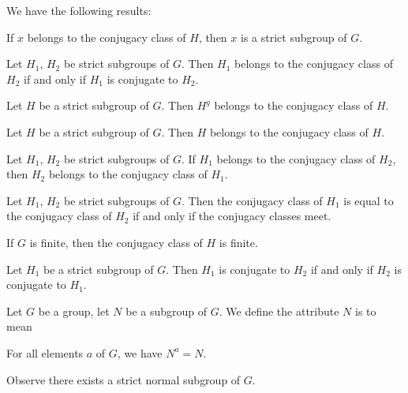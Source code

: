 \documentclass{article}
\begin{document}
We have the following results:
\begin{thm}
\item\label{group3:106} If $x$ belongs to the conjugacy class of $H$,
  then $x$ is a strict subgroup of $G$.
\item\label{group3:107} Let $H_{1}$, $H_{2}$ be strict subgroups of $G$.
  Then $H_{1}$ belongs to the conjugacy class of $H_{2}$ if and only if
  $H_{1}$ is conjugate to $H_{2}$.
\item\label{group3:108} Let $H$ be a strict subgroup of $G$. Then
  $H^{g}$ belongs to the conjugacy class of $H$.
\item\label{group3:109} Let $H$ be a strict subgroup of $G$. Then
  $H$ belongs to the conjugacy class of $H$.
\item\label{group3:110} Let $H_{1}$, $H_{2}$ be strict subgroups of $G$.
  If $H_{1}$ belongs to the conjugacy class of $H_{2}$, then $H_{2}$
  belongs to the conjugacy class of $H_{1}$.
\item\label{group3:111} Let $H_{1}$, $H_{2}$ be strict subgroups of $G$.
  Then the conjugacy class of $H_{1}$ is equal to the conjugacy class of
  $H_{2}$ if and only if the conjugacy classes meet.
\item\label{group3:112} If $G$ is finite, then the conjugacy class of
  $H$ is finite.
\item\label{group3:113} Let $H_{1}$ be a strict subgroup of $G$.
  Then $H_{1}$ is conjugate to $H_{2}$ if and only if $H_{2}$ is
  conjugate to $H_{1}$.
\end{thm}

\begin{definition}
Let $G$ be a group, let $N$ be a subgroup of $G$.
We define the attribute $N$ is  to mean
\begin{defn}
\item For all elements $a$ of $G$, we have $N^{a}=N$.
\end{defn}
\end{definition}
Observe there exists a strict normal subgroup of $G$.
\end{document}
